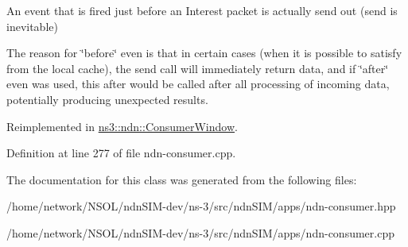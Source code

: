 An event that is fired just before an Interest packet is actually send out (send is inevitable) 

The reason for \char`\"{}before\char`\"{} even is that in certain cases (when it is possible to satisfy from the local cache), the send call will immediately return data, and if \char`\"{}after\char`\"{} even was used, this after would be called after all processing of incoming data, potentially producing unexpected results. 

Reimplemented in \hyperlink{classns3_1_1ndn_1_1ConsumerWindow_ae3a121e015d5470dc26d756ec620c111}{ns3\+::ndn\+::\+Consumer\+Window}.



Definition at line 277 of file ndn-\/consumer.\+cpp.



The documentation for this class was generated from the following files\+:\begin{DoxyCompactItemize}
\item 
/home/network/\+N\+S\+O\+L/ndn\+S\+I\+M-\/dev/ns-\/3/src/ndn\+S\+I\+M/apps/ndn-\/consumer.\+hpp\item 
/home/network/\+N\+S\+O\+L/ndn\+S\+I\+M-\/dev/ns-\/3/src/ndn\+S\+I\+M/apps/ndn-\/consumer.\+cpp\end{DoxyCompactItemize}
